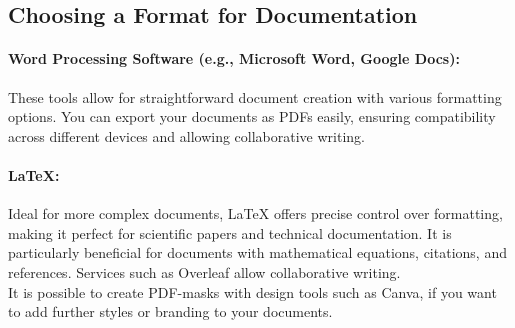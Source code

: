 \subsection*{Choosing a Format for Documentation}
\paragraph{Word Processing Software (e.g., Microsoft Word, Google Docs):} These tools allow for straightforward document creation with various formatting options.
You can export your documents as PDFs easily, ensuring compatibility across different devices and allowing collaborative writing.
\paragraph{LaTeX:} Ideal for more complex documents, LaTeX offers precise control over formatting, making it perfect for scientific papers and technical documentation.
It is particularly beneficial for documents with mathematical equations, citations, and references.
Services such as Overleaf allow collaborative writing. \\  \newline
It is possible to create PDF-masks with design tools such as Canva, if you want to add further styles or branding to your documents.




